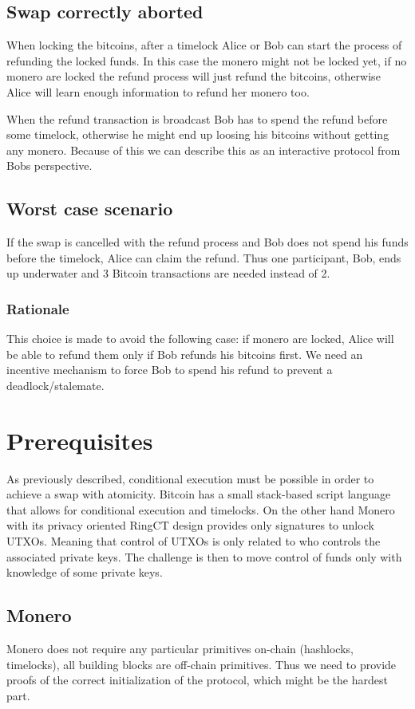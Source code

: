\documentclass{llncs}
\begin{document}
\subsection{Swap correctly aborted}
When locking the bitcoins, after a timelock Alice or Bob can start the process of refunding the locked funds. In this case the monero might not be locked yet, if no monero are locked the refund process will just refund the bitcoins, otherwise Alice will learn enough information to refund her monero too.

When the refund transaction is broadcast Bob has to spend the refund before some timelock, otherwise he might end up loosing his bitcoins without getting any monero.  Because of this we can describe this as an interactive protocol from Bobs perspective.

\subsection{Worst case scenario}
If the swap is cancelled with the refund process and Bob does not spend his funds before the timelock, Alice can claim the refund. Thus one participant, Bob, ends up underwater and 3 Bitcoin transactions are needed instead of 2.

\subsubsection{Rationale}
\label{worstCaseRationale}
This choice is made to avoid the following case: if monero are locked, Alice will be able to refund them only if Bob refunds his bitcoins first.  We need an incentive mechanism to force Bob to spend his refund to prevent a deadlock/stalemate.

\section{Prerequisites}
As previously described, conditional execution must be possible in order to achieve a swap with atomicity. Bitcoin has a small stack-based script language that allows for conditional execution and timelocks. On the other hand Monero with its privacy oriented RingCT design provides only signatures to unlock UTXOs. Meaning that control of UTXOs is only related to who controls the associated private keys. The challenge is then to move control of funds only with knowledge of some private keys.

\subsection{Monero}
Monero does not require any particular primitives on-chain (hashlocks, timelocks), all building blocks are off-chain primitives. Thus we need to provide proofs of the correct initialization of the protocol, which might be the hardest part.
\end{document}
